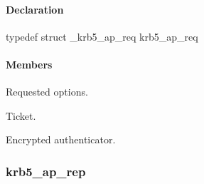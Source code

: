 \documentclass[letterpaper,10pt,english]{sphinxmanual}
\begin{document}
\paragraph{Declaration}
\label{appdev/refs/types/krb5_ap_req:declaration}
typedef struct \_krb5\_ap\_req  krb5\_ap\_req


\paragraph{Members}
\label{appdev/refs/types/krb5_ap_req:members}

\begin{fulllineitems}
\label{appdev/refs/types/krb5_ap_req:krb5_ap_req.magic}
\end{fulllineitems}


\begin{fulllineitems}
\label{appdev/refs/types/krb5_ap_req:krb5_ap_req.ap_options}
Requested options.

\end{fulllineitems}


\begin{fulllineitems}
\label{appdev/refs/types/krb5_ap_req:krb5_ap_req.ticket}
Ticket.

\end{fulllineitems}


\begin{fulllineitems}
\label{appdev/refs/types/krb5_ap_req:krb5_ap_req.authenticator}
Encrypted authenticator.

\end{fulllineitems}



\subsubsection{krb5\_ap\_rep}
\label{appdev/refs/types/krb5_ap_rep:krb5-ap-rep-struct}\label{appdev/refs/types/krb5_ap_rep:krb5-ap-rep}\label{appdev/refs/types/krb5_ap_rep::doc}
\end{document}
